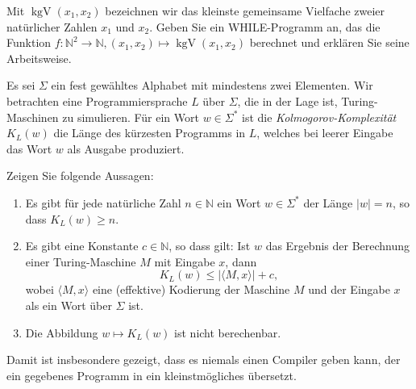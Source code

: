 \documentclass[german]{latteachCD}[2017/03/28]
\begin{document}
\begin{exercise}
  Mit $\operatorname{kgV}(x_{1}, x_{2})$ bezeichnen wir das kleinste gemeinsame Vielfache zweier
  natürlicher Zahlen $x_{1}$ und $x_{2}$.
  Geben Sie ein WHILE-Programm an, das die Funktion $f \colon \mathbb N^{2} \to
  \mathbb N, (x_{1}, x_{2}) \mapsto \operatorname{kgV}(x_{1}, x_{2})$
  berechnet und erklären Sie seine Arbeitsweise. 
\end{exercise}

\begin{exercise}
  Es sei $\Sigma$ ein fest gewähltes Alphabet mit mindestens zwei Elementen.
  Wir betrachten eine Programmiersprache $L$ über $\Sigma$, die in der Lage ist,
  Turing-Maschinen zu simulieren.  Für ein Wort $w \in \Sigma^{*}$ ist die
  \emph{Kolmogorov-Komplexität} $K_{L}(w)$ die Länge des kürzesten Programms in
  $L$, welches bei leerer Eingabe das Wort $w$ als Ausgabe produziert.

  Zeigen Sie folgende Aussagen:
  \begin{enumerate}
  \item Es gibt für jede natürliche Zahl $n \in \mathbb N$ ein Wort $w \in
    \Sigma^{*}$ der Länge $\lvert w\rvert = n$, so dass $K_{L}(w) \geq n$.
  \item Es gibt eine Konstante $c \in \mathbb N$, so dass gilt: Ist $w$ das
    Ergebnis der Berechnung einer Turing-Maschine $M$ mit Eingabe $x$, dann
    \begin{equation*}
      K_{L}(w) \leq \lvert\langle M,x\rangle\rvert + c,
    \end{equation*}
    wobei $\langle M,x\rangle$ eine (effektive) Kodierung der Maschine $M$ und
    der Eingabe $x$ als ein Wort über $\Sigma$ ist.
  \item Die Abbildung $w \mapsto K_{L}(w)$ ist nicht berechenbar.
  \end{enumerate}

  Damit ist insbesondere gezeigt, dass es niemals einen Compiler geben kann, der
  ein gegebenes Programm in ein kleinstmögliches übersetzt.
\end{exercise}
\end{document}
